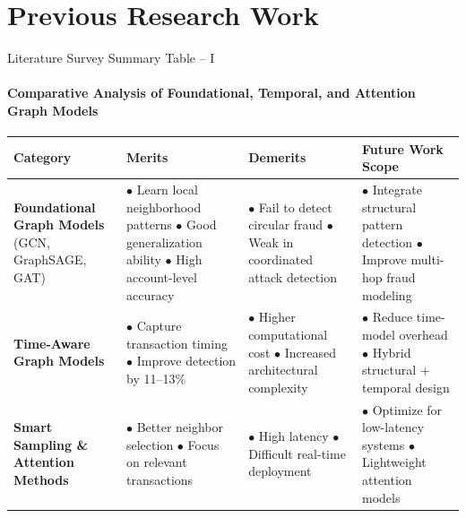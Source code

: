 \documentclass[aspectratio=169, 11pt]{beamer}
\begin{document}
\section{Previous Research Work}

\begin{frame}{Literature Survey Summary Table -- I}
    \framesubtitle{Comparative Analysis of Foundational, Temporal, and Attention Graph Models}
    \vspace{-0.35cm}
    \centering
    \renewcommand{\arraystretch}{0.98}
    \scriptsize
    \begin{tabularx}{\textwidth}{p{2.6cm} p{3.4cm} p{3.2cm} X}
        \toprule
        \textbf{Category} & \textbf{Merits} & \textbf{Demerits} & \textbf{Future Work Scope} \\
        \midrule
        \textbf{Foundational Graph Models} \newline (GCN, GraphSAGE, GAT) & 
        $\bullet$ Learn local neighborhood patterns \newline
        $\bullet$ Good generalization ability \newline
        $\bullet$ High account-level accuracy &
        $\bullet$ Fail to detect circular fraud \newline
        $\bullet$ Weak in coordinated attack detection &
        $\bullet$ Integrate structural pattern detection \newline
        $\bullet$ Improve multi-hop fraud modeling \\
        \addlinespace[2pt]
        \textbf{Time-Aware Graph Models} &
        $\bullet$ Capture transaction timing \newline
        $\bullet$ Improve detection by 11--13\% &
        $\bullet$ Higher computational cost \newline
        $\bullet$ Increased architectural complexity &
        $\bullet$ Reduce time-model overhead \newline
        $\bullet$ Hybrid structural + temporal design \\
        \addlinespace[2pt]
        \textbf{Smart Sampling \& Attention Methods} &
        $\bullet$ Better neighbor selection \newline
        $\bullet$ Focus on relevant transactions &
        $\bullet$ High latency \newline
        $\bullet$ Difficult real-time deployment &
        $\bullet$ Optimize for low-latency systems \newline
        $\bullet$ Lightweight attention models \\
        \bottomrule
    \end{tabularx}
\end{frame}
\end{document}
